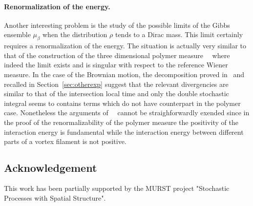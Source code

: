 \paragraph{Renormalization of the energy.} Another interesting problem
is the study of the possible limits of the Gibbs ensemble $\mu_\beta$
when the distribution $\rho$ tends to a Dirac mass. This limit
certainly requires a renormalization of the energy. The situation is
actually very similar to that of the construction of the three dimensional
polymer measure~\cite{Bo}~\cite{We} where indeed the limit exists and is
singular with respect to the reference Wiener measure. In the case of
the Brownian motion, the
decomposition proved in~\cite{Fl2} and recalled in
Section~\ref{sec:otherexp} suggest that the relevant divergencies
are similar to that of the intersection local time and only the double
stochastic integral seems to contains terms which do not have counterpart in the
polymer case. Nonetheless the arguments of~\cite{Bo}~\cite{We} cannot
be straighforwardly exended since in the proof of the
renormalizability of the polymer measure the positivity of the
interaction energy is fundamental while the interaction energy between
different parts of a vortex filament is not positive. 


\subsection*{Acknowledgement} 
This work has been partially supported by the MURST project "Stochastic
Processes with Spatial Structure". 

